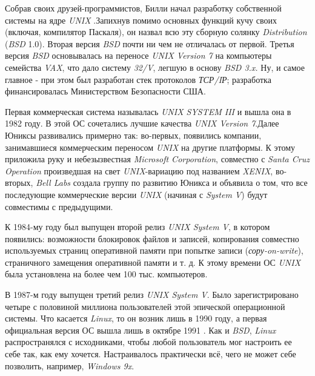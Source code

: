 Собрав своих друзей-программистов, Билли начал разработку собственной системы на ядре \textit{UNIX} .Запихнув помимо основных функций кучу своих (включая, компилятор Паскаля), он назвал всю эту сборную солянку \textit{Distribution} (\textit{BSD} 1.0). Вторая версия \textit{BSD} почти ни чем не отличалась от первой. Третья версия \textit{BSD} основывалась на переносе \textit{UNIX Version 7} на компьютеры семейства \textit{VAX}, что дало систему \textit{32/V}, легшую в основу \textit{BSD 3.x.} Ну, и самое главное - при этом был разработан стек протоколов \textit{ТСР/IР}; разработка финансировалась Министерством Безопасности США.

Первая коммерческая система называлась \textit{UNIX SYSTEM III} и вышла она в 1982 году. В этой ОС сочетались лучшие качества \textit{UNIX Version 7}.Далее Юниксы развивались примерно так: во-первых, появились компании, занимавшиеся коммерческим переносом \textit{UNIX} на другие платформы. К этому приложила руку и небезызвестная \textit{Microsoft Corporation}, совместно с \textit{Santa Cruz Operation} произведшая на свет \textit{UNIX}-вариацию под названием \textit{XENIX}, во-вторых,\textit{ Bell Labs} создала группу по развитию Юникса и объявила о том, что все последующие коммерческие версии \textit{UNIX} (начиная с \textit{System V}) будут совместимы с предыдущими.

К 1984-му году был выпущен второй релиз \textit{UNIX System V}, в котором появились: возможности блокировок файлов и записей, копирования совместно используемых страниц оперативной памяти при попытке записи (\textit{сору-on-write}), страничного замещения оперативной памяти и т. д. К этому времени ОС \textit{UNIX} была установлена на более чем 100 тыс. компьютеров.

В 1987-м году выпущен третий релиз \textit{UNIX System V}. Было зарегистрировано четыре с половиной миллиона пользователей этой эпической операционной системы. Что касается \textit{Linux}, то он возник лишь в 1990 году, а первая официальная версия ОС вышла лишь в октябре 1991 . Как и \textit{BSD}, \textit{Linux} распространялся с исходниками, чтобы любой пользователь мог настроить ее себе так, как ему хочется. Настраивалось практически всё, чего не может себе позволить, например, \textit{Windows 9x}.



